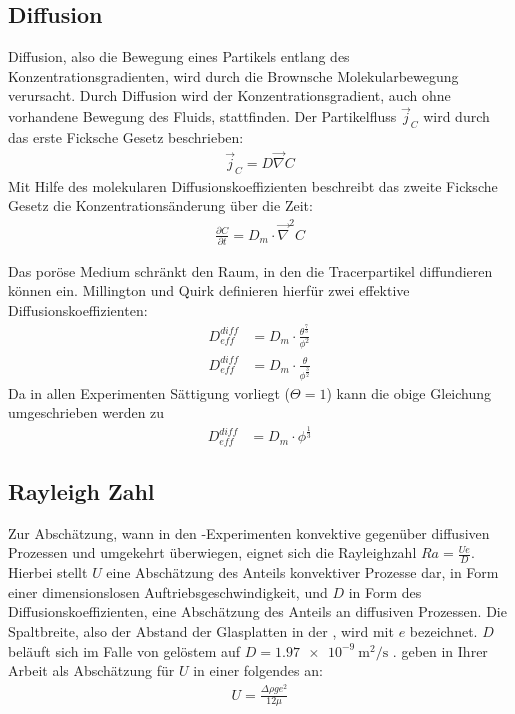 \subsection{Diffusion}
\label{sec:diff}
Diffusion, also die Bewegung eines Partikels entlang des Konzentrationsgradienten, wird durch die Brownsche Molekularbewegung verursacht. Durch Diffusion wird
der Konzentrationsgradient, auch ohne vorhandene Bewegung des Fluids, stattfinden. Der Partikelfluss $\vec{j}_C$ wird durch das erste Ficksche Gesetz
beschrieben:
\begin{align}
 \vec{j}_C = D \vec{\nabla} C
\end{align}
Mit Hilfe des molekularen Diffusionskoeffizienten beschreibt das zweite Ficksche Gesetz die Konzentrationsänderung über die Zeit:
\begin{align}
 \frac{\partial C}{\partial t} = D_m \cdot \vec{\nabla}^2 C
\end{align}

Das poröse Medium schränkt den Raum, in den die Tracerpartikel diffundieren können ein. Millington und Quirk \citeyearpar{milli-quir} definieren hierfür zwei 
effektive Diffusionskoeffizienten:
\begin{align}
 D_{eff}^{diff} &= D_m \cdot \frac{\theta^{\frac{7}{3}}}{\phi^2} \\
 D_{eff}^{diff} &= D_m \cdot \frac{\theta}{              \phi^\frac{3}{2}}
\end{align}
Da in allen Experimenten Sättigung vorliegt ($\Theta = 1$) kann die obige Gleichung umgeschrieben werden zu
\begin{align}
 D_{eff}^{diff} &= D_m \cdot \phi^{\frac{1}{3}}
 \label{eq:Deff}
\end{align}

\subsection{Rayleigh Zahl}
\label{sec:ray}

Zur Abschätzung, wann in den \HSC-Experimenten konvektive gegenüber diffusiven Prozessen und umgekehrt überwiegen, eignet sich die Rayleighzahl $Ra = \frac{Ue}{D}$. Hierbei stellt $U$ eine Abschätzung des Anteils konvektiver Prozesse dar, in Form einer dimensionslosen Auftriebsgeschwindigkeit, und $D$ in Form des Diffusionskoeffizienten, eine Abschätzung des Anteils an diffusiven Prozessen. Die Spaltbreite, also der Abstand der Glasplatten in der \HSC, wird mit $e$ bezeichnet.
$D$ beläuft sich im Falle von gelöstem \COT auf $D = \SI{1,97e-9}{\meter\squared\per\second}$ \citep{frank}.
\cite{fernandez} geben in Ihrer Arbeit als Abschätzung für $U$ in einer \HSC folgendes an:
\begin{align}
 U = \frac{\Delta\rho g e^2}{12 \mu}
 \label{eq:U}
\end{align}

